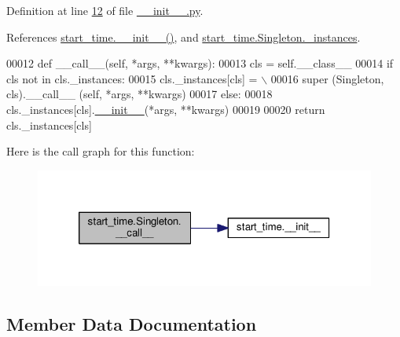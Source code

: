 Definition at line \hyperlink{start__time_2____init_____8py_source_l00012}{12} of file \hyperlink{start__time_2____init_____8py_source}{\+\_\+\+\_\+init\+\_\+\+\_\+.\+py}.



References \hyperlink{start__time_2____init_____8py_source_l00037}{start\+\_\+time.\+\_\+\+\_\+init\+\_\+\+\_\+()}, and \hyperlink{start__time_2____init_____8py_source_l00011}{start\+\_\+time.\+Singleton.\+\_\+instances}.


\begin{DoxyCode}
00012     \textcolor{keyword}{def }\_\_call\_\_(self, *args, **kwargs):
00013         cls = self.\_\_class\_\_
00014         \textcolor{keywordflow}{if} cls \textcolor{keywordflow}{not} \textcolor{keywordflow}{in} cls.\_instances:
00015             cls.\_instances[cls] = \(\backslash\)
00016                 super (Singleton, cls).\_\_call\_\_ (self, *args, **kwargs)
00017         \textcolor{keywordflow}{else}:
00018             cls.\_instances[cls].\hyperlink{namespacestart__time_a9c9bd378729a13c96a22c8b079ea172c}{\_\_init\_\_}(*args, **kwargs)
00019                     
00020         \textcolor{keywordflow}{return} cls.\_instances[cls]
\end{DoxyCode}
Here is the call graph for this function\+:
\nopagebreak
\begin{figure}[H]
\begin{center}
\leavevmode
\includegraphics[width=320pt]{classstart__time_1_1_singleton_af0e193a3b8d4b62db86957e47c60e16f_cgraph}
\end{center}
\end{figure}


\subsection{Member Data Documentation}
\mbox{\label{classstart__time_1_1_singleton_a541fb2b583fdf801b3c77804fe9900b1}} 
